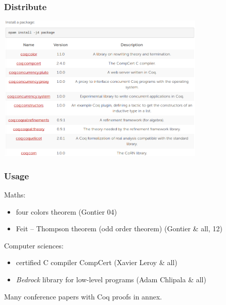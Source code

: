 \begin{frame}
  \frametitle{Distribute}
  \begin{center}
    \includegraphics[width=10cm]{images/opam}
  \end{center}
\end{frame}

\begin{frame}
  \frametitle{Usage}
  Maths:
  \begin{itemize}
    \item four colors theorem (Gontier 04)
    \item Feit -- Thompson theorem (odd order theorem) (Gontier \& all, 12)
  \end{itemize}

  Computer sciences:
  \begin{itemize}
    \item certified \textsc{C} compiler CompCert (Xavier Leroy \& all)
    \item \emph{Bedrock} library for low-level programs (Adam Chlipala \& all)
  \end{itemize}

  Many conference papers with Coq proofs in annex.
\end{frame}


